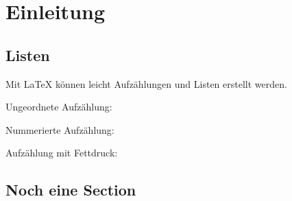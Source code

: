 \chapter{Einleitung}

\blindtext

\section{Listen}

Mit \LaTeX{} können leicht Aufzählungen und Listen erstellt werden.

Ungeordnete Aufzählung:
\blinditemize

Nummerierte Aufzählung:
\blindenumerate

Aufzählung mit Fettdruck:
\blinddescription

\section{Noch eine Section}

\blindtext